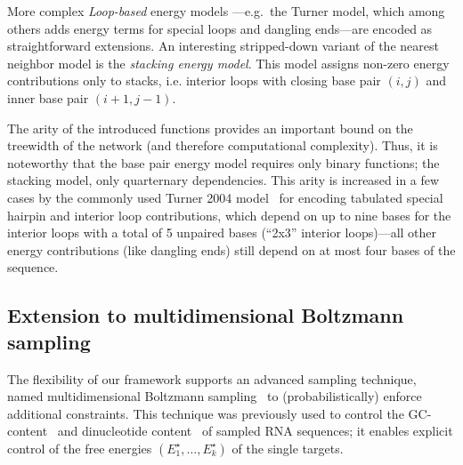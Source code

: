 \documentclass{bioinfo}
\newcommand{\val}{a} %
\newcommand{\Ehp}[1]{E^{\textrm{hp}}(#1)}
\newcommand{\Def}[1]{{\it #1}}
\newcommand{\TargetE}{E^{\star}}
\newcommand{\Nuc}[1]{{\sf #1}}
\newcommand{\Cb}{\Nuc{C}}
\newcommand{\Gb}{\Nuc{G}}
\newcommand{\GCb}{\Gb\Cb}
\newcommand{\evalfor}[2]{#1\llbracket{}#2\rrbracket{}}
\begin{document}

More complex \Def{Loop-based}
 energy models ---e.g.~the Turner model,
which among others adds energy terms for special loops and dangling
ends---are encoded as straightforward extensions. An interesting
stripped-down variant of the nearest neighbor model is the
\Def{stacking energy model}. This model assigns non-zero energy
contributions only to stacks, i.e. interior loops with closing base
pair $(i,j)$ and inner base pair $(i+1,j-1)$.

The arity of the introduced functions provides an important bound on the
treewidth of the network (and therefore computational
complexity). Thus, it is noteworthy that the base pair energy model
requires only binary functions; the stacking model, only quarternary
dependencies. This arity is increased in a few cases by the commonly
used Turner 2004 model~\cite{Turner2009} for encoding tabulated
special hairpin and interior loop contributions, which depend on up to
nine bases for the interior loops with a total of 5 unpaired bases
(``2x3'' interior loops)---all other energy contributions (like
dangling ends) still depend on at most four bases of the sequence.

\subsection{Extension to multidimensional Boltzmann sampling}\label{sec:multiBoltzmann}
The flexibility of our framework supports an advanced sampling technique, named multidimensional Boltzmann sampling~\cite{Bodini2010} to (probabilistically) enforce additional constraints.
This technique was previously used to control the \GCb-content~\cite{Waldispuehl2011,Reinharz2013} and dinucleotide content~\cite{Zhang2013} of sampled RNA sequences; it enables explicit control of the free energies $(\TargetE_1,\ldots,\TargetE_k)$ of the single targets. %
\end{document}
